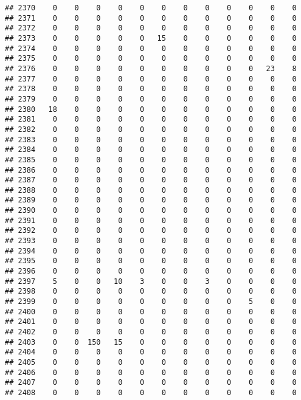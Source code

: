 \documentclass[]{article}
\begin{document}
\begin{verbatim}
## 2370    0    0    0    0    0    0    0    0    0    0    0    0
## 2371    0    0    0    0    0    0    0    0    0    0    0    0
## 2372    0    0    0    0    0    0    0    0    0    0    0    0
## 2373    0    0    0    0    0   15    0    0    0    0    0    0
## 2374    0    0    0    0    0    0    0    0    0    0    0    0
## 2375    0    0    0    0    0    0    0    0    0    0    0    0
## 2376    0    0    0    0    0    0    0    0    0    0   23    8
## 2377    0    0    0    0    0    0    0    0    0    0    0    0
## 2378    0    0    0    0    0    0    0    0    0    0    0    0
## 2379    0    0    0    0    0    0    0    0    0    0    0    0
## 2380   18    0    0    0    0    0    0    0    0    0    0    0
## 2381    0    0    0    0    0    0    0    0    0    0    0    0
## 2382    0    0    0    0    0    0    0    0    0    0    0    0
## 2383    0    0    0    0    0    0    0    0    0    0    0    0
## 2384    0    0    0    0    0    0    0    0    0    0    0    0
## 2385    0    0    0    0    0    0    0    0    0    0    0    0
## 2386    0    0    0    0    0    0    0    0    0    0    0    0
## 2387    0    0    0    0    0    0    0    0    0    0    0    0
## 2388    0    0    0    0    0    0    0    0    0    0    0    0
## 2389    0    0    0    0    0    0    0    0    0    0    0    0
## 2390    0    0    0    0    0    0    0    0    0    0    0    0
## 2391    0    0    0    0    0    0    0    0    0    0    0    0
## 2392    0    0    0    0    0    0    0    0    0    0    0    0
## 2393    0    0    0    0    0    0    0    0    0    0    0    0
## 2394    0    0    0    0    0    0    0    0    0    0    0    0
## 2395    0    0    0    0    0    0    0    0    0    0    0    0
## 2396    0    0    0    0    0    0    0    0    0    0    0    0
## 2397    5    0    0   10    3    0    0    3    0    0    0    0
## 2398    0    0    0    0    0    0    0    0    0    0    0    0
## 2399    0    0    0    0    0    0    0    0    0    5    0    0
## 2400    0    0    0    0    0    0    0    0    0    0    0    0
## 2401    0    0    0    0    0    0    0    0    0    0    0    0
## 2402    0    0    0    0    0    0    0    0    0    0    0    0
## 2403    0    0  150   15    0    0    0    0    0    0    0    0
## 2404    0    0    0    0    0    0    0    0    0    0    0    0
## 2405    0    0    0    0    0    0    0    0    0    0    0    0
## 2406    0    0    0    0    0    0    0    0    0    0    0    0
## 2407    0    0    0    0    0    0    0    0    0    0    0    0
## 2408    0    0    0    0    0    0    0    0    0    0    0    0

\end{verbatim}
\end{document}
